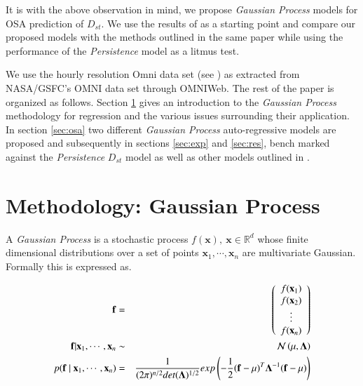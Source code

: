 \documentclass[referee,a4paper,12pt,traditabstract]{swsc}
\begin{document}
\begin{linenumbers}
It is with the above observation in mind, we propose \emph{Gaussian Process} models for OSA prediction of $D_{st}$. We use the results of \citet{Ji2012} as a starting point and compare our proposed models with the methods outlined in the same paper while using the performance of the \emph{Persistence} model as a litmus test. 

We use the hourly resolution Omni data set (see \cite{OmniPaper}) as extracted from NASA/GSFC's OMNI data set through OMNIWeb. The rest of the paper is organized as follows. Section \ref{sec:method} gives an introduction to the \emph{Gaussian Process} methodology for regression and the various issues surrounding their application. In section \ref{sec:osa} two different \emph{Gaussian Process} auto-regressive models are proposed and subsequently in sections \ref{sec:exp} and \ref{sec:res}, bench marked against the \emph{Persistence} $D_{st}$ model as well as other models outlined in \citet{Ji2012}.

  
\section{Methodology: Gaussian Process} \label{sec:method}

A \emph{Gaussian Process} is a stochastic process $f(\mathbf{x}), \ \mathbf{x} \in \mathbb{R}^d$ whose finite dimensional distributions over a set of points $\mathbf{x}_1, \cdots, \mathbf{x}_n$ are multivariate Gaussian. Formally this is expressed as.

\begin{eqnarray}
 \mathbf{f} & = & \left( \begin{array}{c} f(\mathbf{x}_1) \\ f(\mathbf{x}_2) \\ \vdots \\ f(\mathbf{x}_n) \end{array} \right) \\
 \vspace{2\baselineskip}
 \mathbf{f} | \mathbf{x}_1, \cdots, \mathbf{x}_n & \sim & \mathcal{N}\left( \mathbf{\mu}, \mathbf{\Lambda} \right)  \\
 \vspace{2\baselineskip}
 p( \mathbf{f} \ | \ \mathbf{x}_1, \cdots, \mathbf{x}_n) & = & \frac{1}{(2\pi)^{n/2} det(\mathbf{\Lambda})^{1/2}} exp \left(-\frac{1}{2} (\mathbf{f} - \mathbf{\mu})^T \mathbf{\Lambda}^{-1} (\mathbf{f} - \mathbf{\mu}) \right) \label{eq:sto}
\end{eqnarray}


\end{linenumbers}
\end{document}
